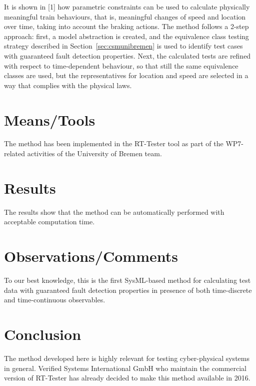 It is shown in [1] how parametric constraints can be used to calculate
physically meaningful train behaviours, that is, meaningful changes of
speed and location over time, taking into account the braking
actions. The method follows a 2-step approach: first, a model
abstraction is created, and the equivalence class testing strategy
described in Section~\ref{sec:csmunibremen} is used to identify test
cases with guaranteed fault detection properties. Next, the calculated
tests are refined with respect to time-dependent behaviour, so that
still the same equivalence classes are used, but the representatives
for location and speed are selected in a way that complies with the
physical laws.

 


\section{Means/Tools}

The method has been implemented in the RT-Tester tool as part of the WP7-related
activities of the University of Bremen team.

\section{Results}

The results show that the method can be automatically performed with acceptable 
computation time. 

\section{Observations/Comments}

To our best knowledge, this is the first SysML-based method for
calculating test data with guaranteed fault detection properties in
presence of both time-discrete and time-continuous observables.


\section{Conclusion}

The method developed here is highly relevant for testing
cyber-physical systems in general. Verified Systems International GmbH
who maintain the commercial version of RT-Tester has already decided
to make this method available in 2016.

